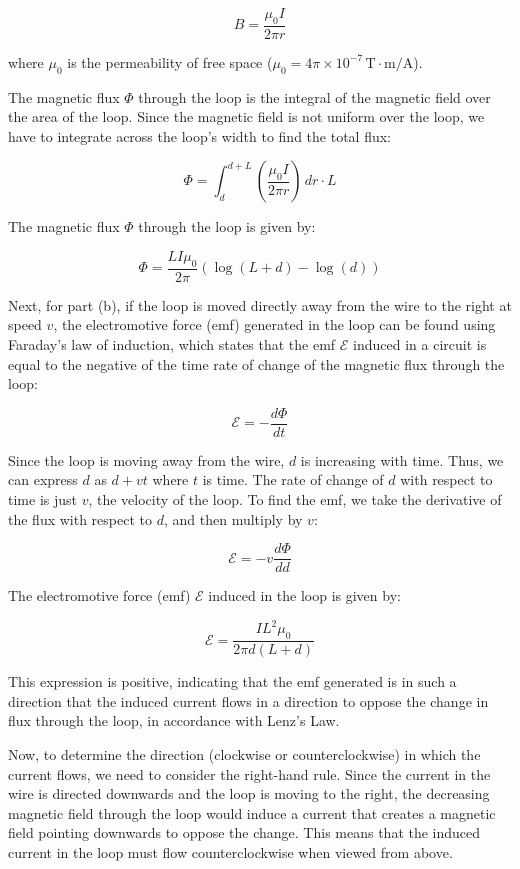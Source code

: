 \[
B = \frac{\mu_0 I}{2\pi r}
\]

where \( \mu_0 \) is the permeability of free space (\( \mu_0 = 4\pi \times 10^{-7} \, \text{T} \cdot \text{m/A} \)).

The magnetic flux \( \Phi \) through the loop is the integral of the magnetic field over the area of the loop. Since the magnetic field is not uniform over the loop, we have to integrate across the loop's width to find the total flux:

\[
\Phi = \int_{d}^{d+L} \left( \frac{\mu_0 I}{2\pi r} \right) \, dr \cdot L
\]

The magnetic flux \( \Phi \) through the loop is given by:

\[
\Phi = \frac{L I \mu_0}{2\pi} \left( \log(L + d) - \log(d) \right)
\]

Next, for part (b), if the loop is moved directly away from the wire to the right at speed \( v \), the electromotive force (emf) generated in the loop can be found using Faraday's law of induction, which states that the emf \( \mathcal{E} \) induced in a circuit is equal to the negative of the time rate of change of the magnetic flux through the loop:

\[
\mathcal{E} = -\frac{d\Phi}{dt}
\]

Since the loop is moving away from the wire, \( d \) is increasing with time. Thus, we can express \( d \) as \( d + vt \) where \( t \) is time. The rate of change of \( d \) with respect to time is just \( v \), the velocity of the loop. To find the emf, we take the derivative of the flux with respect to \( d \), and then multiply by \( v \):

\[
\mathcal{E} = -v \frac{d\Phi}{dd}
\]

The electromotive force (emf) \(\mathcal{E}\) induced in the loop is given by:

\[
\mathcal{E} = \frac{I L^2 \mu_0}{2\pi d (L + d)}
\]

This expression is positive, indicating that the emf generated is in such a direction that the induced current flows in a direction to oppose the change in flux through the loop, in accordance with Lenz's Law.

Now, to determine the direction (clockwise or counterclockwise) in which the current flows, we need to consider the right-hand rule. Since the current in the wire is directed downwards and the loop is moving to the right, the decreasing magnetic field through the loop would induce a current that creates a magnetic field pointing downwards to oppose the change. This means that the induced current in the loop must flow counterclockwise when viewed from above.

